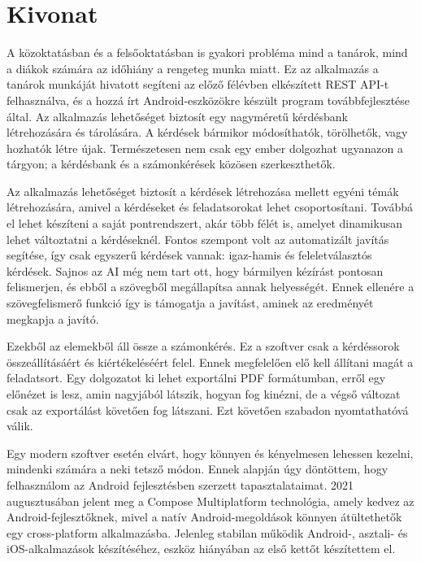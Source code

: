 \setcounter{page}{1}

\selecthungarian

\chapter*{Kivonat}

A közoktatásban és a felsőoktatásban is gyakori probléma mind a tanárok, mind a diákok számára az időhiány a rengeteg munka miatt.
Ez az alkalmazás a tanárok munkáját hivatott segíteni az előző félévben elkészített REST API-t felhasználva, és a hozzá írt Android-eszközökre készült program továbbfejlesztése által.
Az alkalmazás lehetőséget biztosít egy nagyméretű kérdésbank létrehozására és tárolására.
A kérdések bármikor módosíthatók, törölhetők, vagy hozhatók létre újak.
Természetesen nem csak egy ember dolgozhat ugyanazon a tárgyon; a kérdésbank és a számonkérések közösen szerkeszthetők.

Az alkalmazás lehetőséget biztosít a kérdések létrehozása mellett egyéni témák létrehozására, amivel a kérdéseket és feladatsorokat lehet csoportosítani.
Továbbá el lehet készíteni a saját pontrendszert, akár több félét is, amelyet dinamikusan lehet változtatni a kérdéseknél.
Fontos szempont volt az automatizált javítás segítése, így csak egyszerű kérdések vannak: igaz-hamis és feleletválasztós kérdések.
Sajnos az AI még nem tart ott, hogy bármilyen kézírást pontosan felismerjen, és ebből a szövegből megállapítsa annak helyességét. Ennek ellenére a szövegfelismerő funkció így is támogatja a javítást, aminek az eredményét megkapja a javító.

Ezekből az elemekből áll össze a számonkérés.
Ez a szoftver csak a kérdéssorok összeállításáért és kiértékeléséért felel. 
Ennek megfelelően elő kell állítani magát a feladatsort. 
Egy dolgozatot ki lehet exportálni PDF formátumban, erről egy előnézet is lesz, amin nagyjából látszik, hogyan fog kinézni, de a végső változat csak az exportálást követően fog látszani. 
Ezt követően szabadon nyomtathatóvá válik.

Egy modern szoftver esetén elvárt, hogy könnyen és kényelmesen lehessen kezelni, mindenki számára a neki tetsző módon. 
Ennek alapján úgy döntöttem, hogy felhasználom az Android fejlesztésben szerzett tapasztalataimat. 
2021 augusztusában jelent meg a Compose Multiplatform technológia, amely kedvez az Android-fejlesztőknek, mivel a natív Android-megoldások könnyen átültethetők egy cross-platform alkalmazásba. 
Jelenleg stabilan működik Android-, asztali- és iOS-alkalmazások készítéséhez, eszköz hiányában az első kettőt készítettem el.


